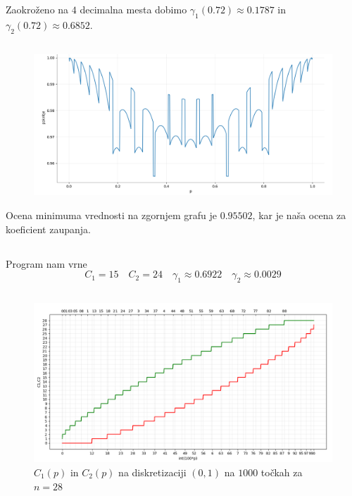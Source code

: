\documentclass[ letterpaper, titlepage, fleqn]{article}
\begin{document}
\subsection{}
Zaokroženo na $4$ decimalna mesta dobimo $\gamma_1(0.72) \approx 0.1787$ in $\gamma_2(0.72) \approx 0.6852$.

\subsection{}
\begin{center}
\begin{figure}[h]
\begin{center}
\includegraphics[width=15cm]{graphics/Pokritje.png}
\end{center}
\end{figure}
\end{center}
Ocena minimuma vrednosti na zgornjem grafu je $0.95502$, kar je naša ocena za koeficient zaupanja.

\subsection{}
Program nam vrne
$$C_1 = 15 \quad C_2 = 24 \quad \gamma_1 \approx 0.6922 \quad \gamma_2 \approx 0.0029$$

\subsection{}
\begin{center}
\begin{figure}[h]
\begin{center}
\includegraphics[width=15cm]{graphics/C1C2_28.png}
\caption{$C_1(p)$ in $C_2(p)$  na diskretizaciji $(0,1)$ na $1000$ točkah za $n=28$}
\end{center}
\end{figure}
\end{center}
\end{document}
